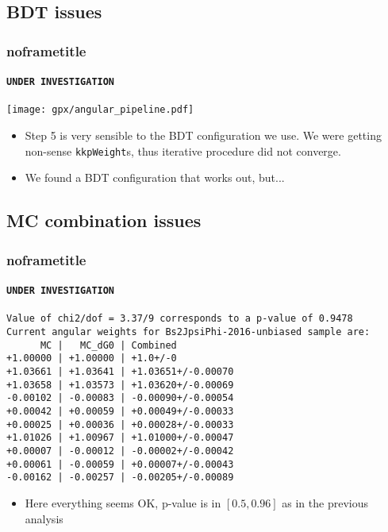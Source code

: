 \documentclass[aspectratio=43]{beamer}
\begin{document}
\subsection{BDT issues}
\begin{frame}[default]
\frametitle{noframetitle}
\framesubtitle{ \texttt{\color{scqred}UNDER INVESTIGATION} }

\begin{center}
  \texttt{[image: gpx/angular\_pipeline.pdf]}
\end{center}


\begin{itemize}
  \item Step 5 is very sensible to the BDT configuration we use. We were getting non-sense \texttt{kkpWeight}s, thus iterative procedure did not converge.
  \item We found a BDT configuration that works out, but...
\end{itemize}


\end{frame}



\subsection{MC combination issues}
\begin{frame}
\frametitle{noframetitle}
\framesubtitle{ \texttt{\color{scqred}UNDER INVESTIGATION} }

\footnotesize

\begin{verbatim}
Value of chi2/dof = 3.37/9 corresponds to a p-value of 0.9478
Current angular weights for Bs2JpsiPhi-2016-unbiased sample are:
      MC |   MC_dG0 | Combined
+1.00000 | +1.00000 | +1.0+/-0
+1.03661 | +1.03641 | +1.03651+/-0.00070
+1.03658 | +1.03573 | +1.03620+/-0.00069
-0.00102 | -0.00083 | -0.00090+/-0.00054
+0.00042 | +0.00059 | +0.00049+/-0.00033
+0.00025 | +0.00036 | +0.00028+/-0.00033
+1.01026 | +1.00967 | +1.01000+/-0.00047
+0.00007 | -0.00012 | -0.00002+/-0.00042
+0.00061 | -0.00059 | +0.00007+/-0.00043
-0.00162 | -0.00257 | -0.00205+/-0.00089
\end{verbatim}

\normalsize

\begin{itemize}
  \item Here everything seems OK, p-value is in $[0.5, 0.96]$ as in the previous analysis
\end{itemize}


\end{frame}
\end{document}
